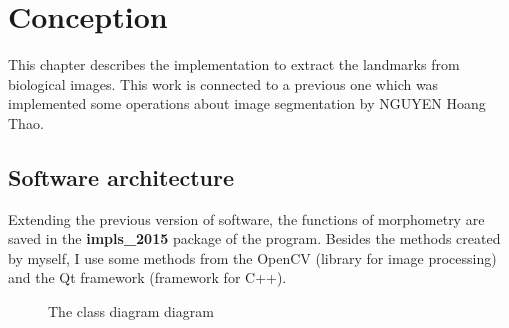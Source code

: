 \chapter{Conception}
This chapter describes the implementation to extract the landmarks from biological images. This work is connected to a previous one which was implemented some operations about image segmentation by NGUYEN Hoang Thao. 
\section{Software architecture}
Extending the previous version of software, the functions of morphometry are saved in the \textbf{impls\_2015} package of the program. Besides the methods created by myself, I use some methods from the OpenCV (library for image processing) and the Qt framework (framework for C++).\\[0.2cm]
\begin{figure}[p]
    \vspace*{-3cm}
    \caption{The class diagram diagram}
    \label{fig:cdiagram}
\end{figure}

